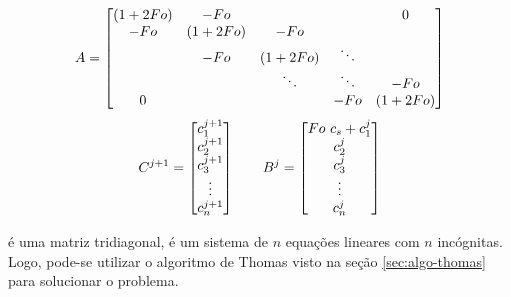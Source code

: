 \begin{equation*}
	\cmrtext{A} =
	\begin{bmatrix}
		(1+2Fo) & -Fo &         &        & 0\\
		-Fo & (1+2Fo) &  -Fo   &        & \\
		    & -Fo &   (1+2Fo)   & \ddots & \\
		    &     &  \ddots & \ddots & -Fo \\
	     0  &     &         &  -Fo   & (1+2Fo) 
	\end{bmatrix}
\end{equation*}
\begin{equation*}
	\cmrtext{C^{j+1}} =
	\begin{bmatrix}
		c_1^{j+1} \\
		c_2^{j+1} \\
		c_3^{j+1} \\
		\vdots \\
		c_n^{j+1}
	\end{bmatrix}
	\qquad
	\cmrtext{B^j} =	
	\begin{bmatrix}
		Fo\ c_s+c_1^j \\
		c_2^{j} \\
		c_3^{j} \\
		\vdots \\
		c_n^{j}
	\end{bmatrix}
\end{equation*}

 é uma matriz tridiagonal,  é um sistema de $n$ equações lineares com $n$ incógnitas. Logo, pode-se utilizar o algoritmo de Thomas visto na seção \ref{sec:algo-thomas} para solucionar o problema.